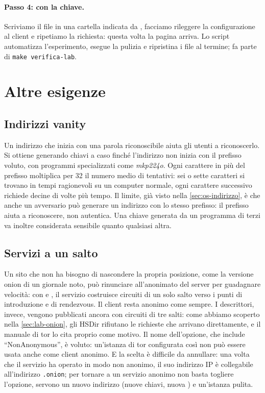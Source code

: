 \paragraph{Passo 4: con la chiave.} Scriviamo il file  in una cartella indicata da , facciamo rileggere la configurazione al client e ripetiamo la richiesta: questa volta la pagina arriva. Lo script  automatizza l'esperimento, esegue la pulizia e ripristina i file  al termine; fa parte di \texttt{make verifica-lab}.

\section{Altre esigenze}\label{sec:onionp-altre}

\subsection{Indirizzi vanity}

Un indirizzo che inizia con una parola riconoscibile aiuta gli utenti a riconoscerlo. Si ottiene generando chiavi a caso finché l'indirizzo non inizia con il prefisso voluto, con programmi specializzati come \emph{mkp224o}. Ogni carattere in più del prefisso moltiplica per 32 il numero medio di tentativi: sei o sette caratteri si trovano in tempi ragionevoli su un computer normale, ogni carattere successivo richiede decine di volte più tempo. Il limite, già visto nella \cref{sec:os-indirizzo}, è che anche un avversario può generare un indirizzo con lo stesso prefisso: il prefisso aiuta a riconoscere, non autentica. Una chiave generata da un programma di terzi va inoltre considerata sensibile quanto qualsiasi altra.

\subsection{Servizi a un salto}

Un sito che non ha bisogno di nascondere la propria posizione, come la versione onion di un giornale noto, può rinunciare all'anonimato del server per guadagnare velocità: con  e , il servizio costruisce circuiti di un solo salto verso i punti di introduzione e di rendezvous. Il client resta anonimo come sempre. I descrittori, invece, vengono pubblicati ancora con circuiti di tre salti: come abbiamo scoperto nella \cref{sec:lab-onion}, gli HSDir rifiutano le richieste che arrivano direttamente, e il manuale di tor lo cita proprio come motivo. Il nome dell'opzione, che include \enquote{NonAnonymous}, è voluto: un'istanza di tor configurata così non può essere usata anche come client anonimo. E la scelta è difficile da annullare: una volta che il servizio ha operato in modo non anonimo, il suo indirizzo IP è collegabile all'indirizzo \texttt{.onion}; per tornare a un servizio anonimo non basta togliere l'opzione, servono un nuovo indirizzo (nuove chiavi, nuova ) e un'istanza pulita.

